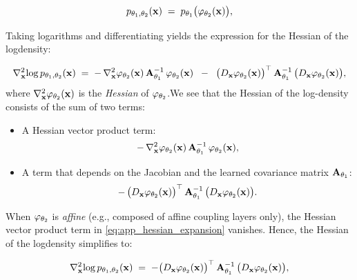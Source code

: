 \begin{equation}
    \label{eq:simplified_app_flow_density}
        p_{\theta_1, \theta_2}(\mathbf{x})
        \;=\;
        p_{\theta_1}\bigl(\varphi_{\theta_2}(\mathbf{x})\bigr),
    \end{equation}

\noindent Taking logarithms and differentiating yields the expression for the Hessian of the logdensity:

\begin{equation}
\label{eq:app_hessian_expansion}
    \nabla_{\mathbf{x}}^2 \!\log p_{\theta_1, \theta_2}(\mathbf{x})
    \;=\;
    -\,\nabla_{\mathbf{x}}^2 \varphi_{\theta_2}(\mathbf{x}) 
       \,\mathbf{A}_{\theta_1}^{-1}\,\varphi_{\theta_2}(\mathbf{x})
    \;\;-\;\;
    \bigl(D_{\mathbf{x}}\varphi_{\theta_2}(\mathbf{x})\bigr)^\top \,\mathbf{A}_{\theta_1}^{-1}\,\bigl(D_{\mathbf{x}}\varphi_{\theta_2}(\mathbf{x})\bigr),
\end{equation}
where \(
    \nabla_{\mathbf{x}}^2 \varphi_{\theta_2}(\mathbf{x})
\)
is the \emph{Hessian} of \(\varphi_{\theta_2}\).We see that the Hessian of the log-density consists of the sum of two terms: 
\begin{itemize}
    \item A Hessian vector product term: 
    \[
    -\,\nabla_{\mathbf{x}}^2 \varphi_{\theta_2}(\mathbf{x}) 
       \,\mathbf{A}_{\theta_1}^{-1}\,\varphi_{\theta_2}(\mathbf{x}),
    \]
    \item A term that depends on the Jacobian and the learned covariance matrix \(\mathbf{A}_{\theta_1}\):
    \[
    -\,\bigl(D_{\mathbf{x}}\varphi_{\theta_2}(\mathbf{x})\bigr)^\top \,\mathbf{A}_{\theta_1}^{-1}\,\bigl(D_{\mathbf{x}}\varphi_{\theta_2}(\mathbf{x})\bigr).
    \]
\end{itemize}

When \(\varphi_{\theta_2}\) is \emph{affine} (e.g., composed of affine coupling layers only), the Hessian vector product term in \eqref{eq:app_hessian_expansion} vanishes. Hence, the Hessian of the logdensity simplifies to:

\begin{equation}
    \label{eq:affine_app_hessian_expansion}
        \nabla_{\mathbf{x}}^2 \!\log p_{\theta_1, \theta_2}(\mathbf{x})
        \;= \; -\bigl(D_{\mathbf{x}}\varphi_{\theta_2}(\mathbf{x})\bigr)^\top \,\mathbf{A}_{\theta_1}^{-1}\,\bigl(D_{\mathbf{x}}\varphi_{\theta_2}(\mathbf{x})\bigr),
\end{equation}

